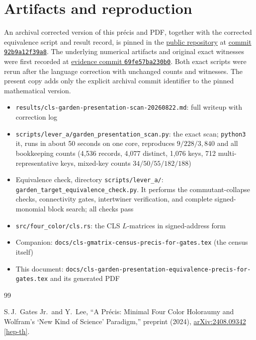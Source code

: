 \documentclass[11pt]{article}
\newcommand{\pathcode}[1]{\nolinkurl{#1}}
\begin{document}
\section{Artifacts and reproduction}

An archival corrected version of this pr\'ecis and PDF, together with the
corrected equivalence script and result record, is pinned in the
\href{https://github.com/p1p3dream/adinkra-codespace}{public repository} at
\href{https://github.com/p1p3dream/adinkra-codespace/commit/92b9a12f39a81e8c939cfc97ae43d7600c0f1366}{commit \texttt{92b9a12f39a8}}.
The underlying numerical artifacts and original exact witnesses were first
recorded at
\href{https://github.com/p1p3dream/adinkra-codespace/commit/69fe57ba230b0dbd8cbc677b0c1b00b08c5b94b6}{evidence commit \texttt{69fe57ba230b0}}.
Both exact scripts were
rerun after the language correction with unchanged counts and witnesses.  The
present copy adds only the explicit archival commit identifier to the pinned
mathematical version.

\begin{itemize}
  \item \pathcode{results/cls-garden-presentation-scan-20260822.md}:
        full writeup with correction log
  \item \pathcode{scripts/lever_a/garden_presentation_scan.py}:
        the exact scan; \texttt{python3} it, runs in about 50 seconds on one
        core, reproduces $9/228/3{,}840$ and all bookkeeping counts
        (4{,}536 records, 4{,}077 distinct, 1{,}076 keys, 712 multi-representative
        keys, mixed-key counts $34/50/55/182/188$)
  \item Equivalence check, directory \pathcode{scripts/lever_a/}:\\[-0.2em]
        \pathcode{garden_target_equivalence_check.py}.  It performs the
        commutant-collapse checks, connectivity gates, intertwiner
        verification, and complete signed-monomial block search; all checks
        pass
  \item \pathcode{src/four_color/cls.rs}:
        the CLS $L$-matrices in signed-address form
  \item Companion: \pathcode{docs/cls-gmatrix-census-precis-for-gates.tex}
        (the census itself)
  \item This document:
        \pathcode{docs/cls-garden-presentation-equivalence-precis-for-gates.tex}
        and its generated PDF
\end{itemize}

\begin{thebibliography}{99}
\small
\setlength{\itemsep}{0.45\baselineskip}

S.\,J.\ Gates Jr.\ and Y.\ Lee,
``A Pr\'ecis: Minimal Four Color Holoraumy and Wolfram's `New Kind
of Science' Paradigm,''
preprint (2024),
\href{https://arxiv.org/abs/2408.09342}{arXiv:2408.09342 [hep-th]}.

\end{thebibliography}
\end{document}
